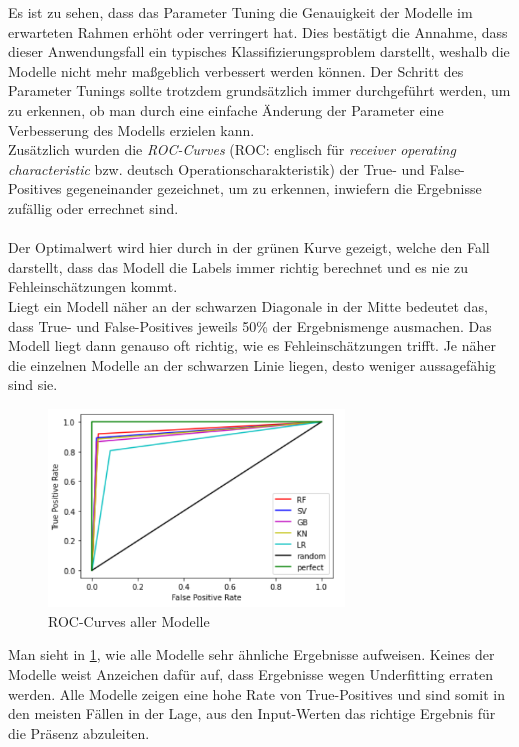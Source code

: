 Es ist zu sehen, dass das Parameter Tuning die Genauigkeit der Modelle im erwarteten Rahmen erhöht oder 
verringert hat. Dies bestätigt die Annahme, dass dieser Anwendungsfall ein typisches Klassifizierungsproblem 
darstellt, weshalb die Modelle nicht mehr maßgeblich verbessert werden können. Der Schritt des Parameter Tunings 
sollte trotzdem grundsätzlich immer durchgeführt werden, um zu erkennen, ob man durch eine einfache Änderung 
der Parameter eine Verbesserung des Modells erzielen kann.\\

\newpage
Zusätzlich wurden die \textit{ROC-Curves} (ROC: englisch für \textit{receiver operating characteristic} bzw. 
deutsch Operationscharakteristik)
der True- und False-Positives gegeneinander gezeichnet, um zu erkennen, 
inwiefern die Ergebnisse zufällig oder errechnet sind.\\\\
Der Optimalwert wird hier durch in der grünen Kurve gezeigt, welche den Fall darstellt, 
dass das Modell die Labels immer richtig berechnet und es nie zu Fehleinschätzungen kommt.\\
Liegt ein Modell näher an der schwarzen Diagonale in der Mitte bedeutet das, dass True- und 
False-Positives jeweils 50\% der Ergebnismenge ausmachen. 
Das Modell liegt dann genauso oft richtig, wie es Fehleinschätzungen trifft. 
Je näher die einzelnen Modelle an der schwarzen Linie liegen, desto weniger aussagefähig sind sie. 

\begin{figure}[h]
    \centering
    \includegraphics[width=0.7\textwidth]{pic/roc_curves.png}
    \caption{ROC-Curves aller Modelle}
    \label{fig:Roc_curves}
\end{figure}

Man sieht in \ref{fig:Roc_curves}, wie alle Modelle sehr ähnliche Ergebnisse aufweisen. Keines der Modelle weist Anzeichen 
dafür auf, dass Ergebnisse wegen Underfitting erraten werden. Alle Modelle zeigen eine hohe Rate von True-Positives und
sind somit in den meisten Fällen in der Lage, aus den Input-Werten das richtige Ergebnis für die Präsenz abzuleiten.  

